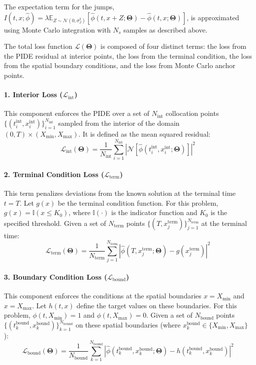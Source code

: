 \documentclass[11pt,twoside,openright]{report}
\begin{document}
The expectation term for the jumps, $I(t,x;\hat{\phi}) = \lambda \mathbb{E}_{Z \sim \mathcal{N}(0,\sigma_J^2)}[\hat{\phi}(t, x+Z; \mathbf{\Theta}) - \hat{\phi}(t, x; \mathbf{\Theta})]$, is approximated using Monte Carlo integration with $N_s$ samples as described above.

The total loss function $\mathcal{L}(\mathbf{\Theta})$ is composed of four distinct terms: the loss from the PIDE residual at interior points, the loss from the terminal condition, the loss from the spatial boundary conditions, and the loss from Monte Carlo anchor points.

\paragraph{1. Interior Loss ($\mathcal{L}_{\text{int}}$)} This component enforces the PIDE over a set of $N_{\text{int}}$ collocation points $\{ (t_i^{\text{int}}, x_i^{\text{int}}) \}_{i=1}^{N_{\text{int}}}$ sampled from the interior of the domain $(0, T) \times (X_{\text{min}}, X_{\text{max}})$. It is defined as the mean squared residual:
$$
\mathcal{L}_{\text{int}}(\mathbf{\Theta}) = \frac{1}{N_{\text{int}}} \sum_{i=1}^{N_{\text{int}}} \left| \mathcal{N}[\hat{\phi}(t_i^{\text{int}}, x_i^{\text{int}}; \mathbf{\Theta})] \right|^2
$$

\paragraph{2. Terminal Condition Loss ($\mathcal{L}_{\text{term}}$)} This term penalizes deviations from the known solution at the terminal time $t=T$. Let $g(x)$ be the terminal condition function. For this problem, $g(x) = \mathbb{I}(x \le K_0)$, where $\mathbb{I}(\cdot)$ is the indicator function and $K_0$ is the specified threshold. Given a set of $N_{\text{term}}$ points $\{ (T, x_j^{\text{term}}) \}_{j=1}^{N_{\text{term}}}$ at the terminal time:
$$
\mathcal{L}_{\text{term}}(\mathbf{\Theta}) = \frac{1}{N_{\text{term}}} \sum_{j=1}^{N_{\text{term}}} \left| \hat{\phi}(T, x_j^{\text{term}}; \mathbf{\Theta}) - g(x_j^{\text{term}}) \right|^2
$$

\paragraph{3. Boundary Condition Loss ($\mathcal{L}_{\text{bound}}$)} This component enforces the conditions at the spatial boundaries $x=X_{\text{min}}$ and $x=X_{\text{max}}$. Let $h(t,x)$ define the target values on these boundaries. For this problem, $\phi(t, X_{\text{min}}) = 1$ and $\phi(t, X_{\text{max}}) = 0$. Given a set of $N_{\text{bound}}$ points $\{ (t_k^{\text{bound}}, x_k^{\text{bound}}) \}_{k=1}^{N_{\text{bound}}}$ on these spatial boundaries (where $x_k^{\text{bound}} \in \{X_{\text{min}}, X_{\text{max}}\}$):
$$
\mathcal{L}_{\text{bound}}(\mathbf{\Theta}) = \frac{1}{N_{\text{bound}}} \sum_{k=1}^{N_{\text{bound}}} \left| \hat{\phi}(t_k^{\text{bound}}, x_k^{\text{bound}}; \mathbf{\Theta}) - h(t_k^{\text{bound}}, x_k^{\text{bound}}) \right|^2
$$
\end{document}
